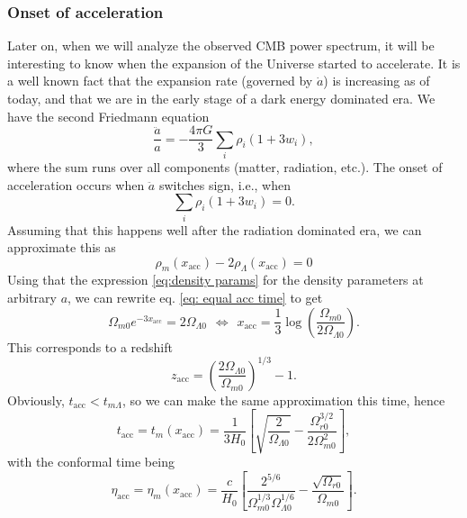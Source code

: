 \documentclass{aa}
\begin{document}
\subsubsection{Onset of acceleration}
Later on, when we will analyze the observed CMB power spectrum, it will be interesting to know when the expansion of the Universe started to accelerate. It is a well known fact that the expansion rate (governed by $\dot{a}$) is increasing as of today, and that we are in the early stage of a dark energy dominated era. We have the second Friedmann equation
\begin{equation}
    \frac{\ddot{a}}{a} = -\frac{4\pi G}{3}\sum_i \rho_i\left(1 + 3w_i \right),
\end{equation}
where the sum runs over all components (matter, radiation, etc.). The onset of acceleration occurs when $\ddot{a}$ switches sign, i.e., when
\begin{equation}
    \sum_i \rho_i\left(1 + 3w_i \right) = 0.
\end{equation}
Assuming that this happens well after the radiation dominated era, we can approximate this as
\begin{equation}
  \rho_m(x_\text{acc})- 2\rho_\Lambda(x_\text{acc}) = 0 \label{eq: equal acc time}
\end{equation}
Using that the expression \eqref{eq:density params} for the density parameters at arbitrary $a$, we can rewrite eq. \eqref{eq: equal acc time} to get
\begin{equation}
  \Omega_{m0}e^{-3x_\text{acc}} = 2\Omega_{\Lambda0}
  \hspace{5pt}\Leftrightarrow\hspace{5pt}
  x_\text{acc} = \frac{1}{3}\log\left(\frac{\Omega_{m0}}{2\Omega_{\Lambda0}}\right).
\end{equation}
This corresponds to a redshift
\begin{equation}
  z_\text{acc} = \left(\frac{2\Omega_{\Lambda0}}{\Omega_{m0}}\right)^{1/3}-1.
\end{equation}
Obviously, $t_\text{acc}<t_{m\Lambda}$, so we can make the same approximation this time, hence
\begin{equation}
    t_\text{acc} = t_m(x_\text{acc}) = \frac{1}{3H_0}\left[\sqrt{\frac{2}{\Omega_{\Lambda0}}} -\frac{\Omega_{r0}^{3/2}}{2\Omega_{m0}^2}\right],
\end{equation}
with the conformal time being
\begin{equation}
    \eta_\text{acc} = \eta_m(x_\text{acc}) = \frac{c}{H_0}\left[\frac{2^{5/6}}{\Omega_{m0}^{1/3}\Omega_{\Lambda0}^{1/6}} - \frac{\sqrt{\Omega_{r0}}}{\Omega_{m0}}\right].
\end{equation}
\end{document}
